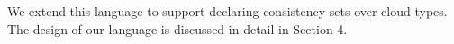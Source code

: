 We extend this language to support declaring consistency sets over cloud types.
The design of our language is discussed in detail in Section 4.
%
%
%
%













































